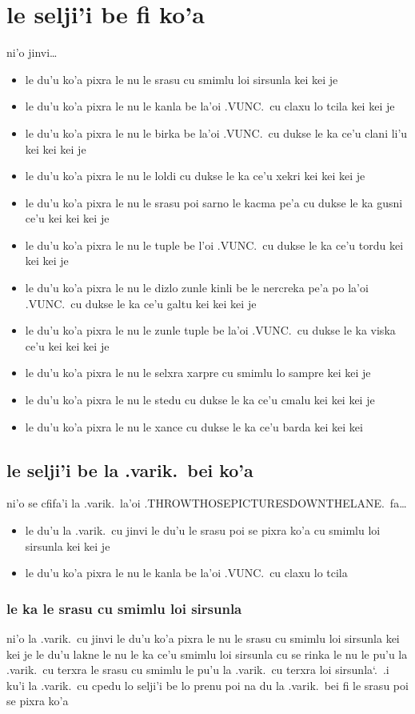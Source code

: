 \documentclass{report}
\newcommand\sds{\spacefactor\sfcode`.\ \space}
\begin{document}
\section{le selji'i be fi ko'a}
ni'o jinvi\ldots
\begin{itemize}
	\item le du'u ko'a pixra le nu le srasu cu smimlu loi sirsunla kei kei je
	\item le du'u ko'a pixra le nu le kanla be la'oi .VUNC.\ cu claxu lo tcila kei kei je
	\item le du'u ko'a pixra le nu le birka be la'oi .VUNC.\ cu dukse le ka ce'u clani li'u kei kei kei je
	\item le du'u ko'a pixra le nu le loldi cu dukse le ka ce'u xekri kei kei kei je
	\item le du'u ko'a pixra le nu le srasu poi sarno le kacma pe'a cu dukse le ka gusni ce'u kei kei kei je
	\item le du'u ko'a pixra le nu le tuple be l'oi .VUNC.\ cu dukse le ka ce'u tordu kei kei kei je
	\item le du'u ko'a pixra le nu le dizlo zunle kinli be le nercreka pe'a po la'oi .VUNC.\ cu dukse le ka ce'u galtu kei kei kei je
	\item le du'u ko'a pixra le nu le zunle tuple be la'oi .VUNC.\ cu dukse le ka viska ce'u kei kei kei je
	\item le du'u ko'a pixra le nu le selxra xarpre cu smimlu lo sampre kei kei je
	\item le du'u ko'a pixra le nu le stedu cu dukse le ka ce'u cmalu kei kei kei je
	\item le du'u ko'a pixra le nu le xance cu dukse le ka ce'u barda kei kei kei
\end{itemize}

\subsection{le selji'i be la .varik.\ bei ko'a}
ni'o se cfifa'i la .varik.\ la'oi .THROWTHOSEPICTURESDOWNTHELANE.\ fa\ldots
\begin{itemize}
	\item le du'u la .varik.\ cu jinvi le du'u le srasu poi se pixra ko'a cu smimlu loi sirsunla kei kei je
	\item le du'u ko'a pixra le nu le kanla be la'oi .VUNC.\ cu claxu lo tcila
\end{itemize}

\subsubsection{le ka le srasu cu smimlu loi sirsunla}
ni'o la .varik.\ cu jinvi le du'u ko'a pixra le nu le srasu cu smimlu loi sirsunla kei kei je le du'u lakne le nu le ka ce'u smimlu loi sirsunla cu se rinka le nu le pu'u la .varik.\ cu terxra le srasu cu smimlu le pu'u la .varik.\ cu terxra loi sirsunla\sds  .i ku'i la .varik.\ cu cpedu lo selji'i be lo prenu poi na du la .varik.\ bei fi le srasu poi se pixra ko'a
\end{document}
